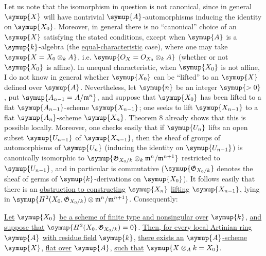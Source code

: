 Let us note that the isomorphism in question is not canonical, since in general $\symup{X}$ will have
nontrivial $\symup{A}$-automorphisms inducing the identity on $\symup{X_0}$. Moreover, in
general there is no “canonical” choice of an $\symup{X}$ satisfying the stated
conditions, except when $\symup{A}$ is a $\symup{k}$-algebra (the \uline{equal-characteristic} case),
where one may take $\symup{X=X_0\otimes_k A}$, i.e.
$\symup{O_X=O_{X_0}\otimes_k A}$ (whether or not $\symup{X_0}$ is affine). In unequal
characteristic, when $\symup{X_0}$ is not affine, I do not know in general whether
$\symup{X_0}$ can be “lifted” to an $\symup{X}$ defined over $\symup{A}$. Nevertheless, let $\symup{n}$ be
an integer $\symup{>0}$, put $\symup{A_{n-1}=A/\mathfrak m^n}$, and suppose that $\symup{X_0}$ has been
lifted to a flat $\symup{A_{n-1}}$-scheme $\symup{X_{n-1}}$; one seeks to lift $\symup{X_{n-1}}$ to a
flat $\symup{A_n}$-scheme $\symup{X_n}$. Theorem 8 already shows that this is possible
locally. Moreover, one checks easily that if $\symup{U_n}$ lifts an open subset
$\symup{U_{n-1}}$ of $\symup{X_{n-1}}$, then the sheaf of groups of automorphisms of $\symup{U_n}$
(inducing the identity on $\symup{U_{n-1}}$) is canonically isomorphic to
$\symup{\mathfrak G_{X_0/k}\otimes_k\mathfrak m^n/\mathfrak m^{n+1}}$
restricted to $\symup{U_{n-1}}$, and in particular is commutative
($\symup{\mathfrak G_{X_0/k}}$ denotes the sheaf of germs of $\symup{k}$-derivations on $\symup{X_0}$).
It follows easily that there is an \uline{obstruction to constructing} $\symup{X_n}$ \uline{lifting}
$\symup{X_{n-1}}$, lying in
$\symup{H^2(X_0,\mathfrak G_{X_0/k})\otimes \mathfrak m^n/\mathfrak m^{n+1}}$.
Consequently:

 \uline{Let} $\symup{X_0}$ \uline{be a scheme of finite type and nonsingular
over} $\symup{k}$, \uline{and suppose that} 
$\symup{H^2(X_0,\mathfrak G_{X_0/k})=0}$. \uline{Then, for every local
Artinian ring} $\symup{A}$ \uline{with residue field} $\symup{k}$, \uline{there exists an} $\symup{A}$\uline{-scheme} $\symup{X}$, \uline{flat
over} $\symup{A}$, \uline{such that} $\symup{X\otimes_A k=X_0}$.

